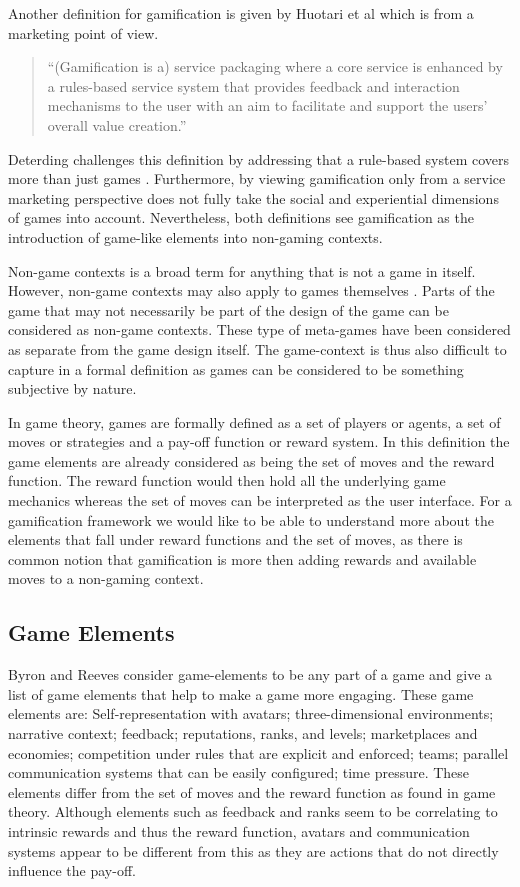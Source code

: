 \documentclass[11pt]{article}
\begin{document}
Another definition for gamification is given by Huotari et al \cite{Huotari2012} which is from a marketing point of view.
\begin{quote}
	“(Gamification is a) service packaging where a core service is
enhanced by a rules-based service system that provides feedback
and interaction mechanisms to the user with an aim to facilitate
and support the users’ overall value creation.”
\end{quote}

Deterding challenges this definition by addressing that a rule-based system covers more than just games \cite{Deterding2011}. Furthermore, by viewing gamification only from a service marketing perspective does not fully take the social and experiential dimensions of games into account. Nevertheless, both definitions see gamification as the introduction of game-like elements into non-gaming contexts.

Non-game contexts is a broad term for anything that is not a game in itself. However, non-game contexts may also apply to games themselves \cite{Deterding2011}. Parts of the game that may not necessarily be part of the design of the game can be considered as non-game contexts. These type of meta-games have been considered as separate from the game design itself. The game-context is thus also difficult to capture in a formal definition as games can be considered to be something subjective by nature. 

In game theory, games are formally defined as a set of players or agents, a set of moves or strategies and a pay-off function or reward system. In this definition the game elements are already considered as being the set of moves and the reward function. The reward function would then hold all the underlying game mechanics whereas the set of moves can be interpreted as the user interface. For a gamification framework we would like to be able to understand more about the elements that fall under reward functions and the set of moves, as there is common notion that gamification is more then adding rewards and available moves to a non-gaming context.

\subsection{Game Elements}
Byron and Reeves \cite{Byron2009} consider game-elements to be any part of a game and give a list of game elements that help to make a game more engaging. These game elements are: Self-representation with avatars; three-dimensional environments; narrative context; feedback; reputations, ranks, and levels; marketplaces and economies; competition under rules that are explicit and enforced; teams; parallel communication systems that can be easily configured; time pressure. These elements differ from the set of moves and the reward function as found in game theory. Although elements such as feedback and ranks seem to be correlating to intrinsic rewards and thus the reward function, avatars and communication systems appear to be different from this as they are actions that do not directly influence the pay-off.
\end{document}
